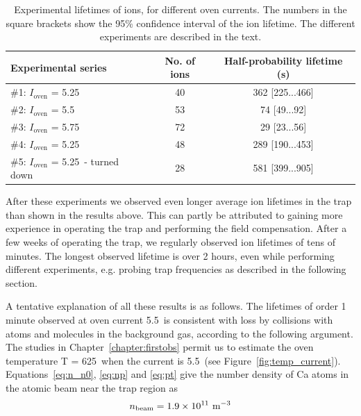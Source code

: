 \begin{table}[t]
\begin{center}
\begin{tabular}{|l|c|c|}
\hline \textbf{Experimental series}  & \textbf{No. of ions} & \textbf{Half-probability lifetime (s)} \\ 
\hline  \#1: $I_{\mbox{oven}}$ =  5.25\A & 40 & 362 [225...466] \\ 
\hline  \#2: $I_{\mbox{oven}}$ = 5.5\A  & 53 & 74 [49...92] \\ 
\hline  \#3: $I_{\mbox{oven}}$ = 5.75\A & 72 & 29 [23...56] \\ 
\hline  \#4: $I_{\mbox{oven}}$ = 5.25\A & 48 & 289 [190...453] \\ 
\hline  \#5: $I_{\mbox{oven}}$ = 5.25\A\, - turned down & 28  &  581 [399...905] \\ 
\hline 
\end{tabular} 
\caption{Experimental lifetimes of ions, for different \CaI{} oven currents. The numbers in the square brackets show the 95\% confidence interval of the ion lifetime. The different experiments are described in the text.}
\label{tab:lifetimes}
\end{center}
\end{table}

After these experiments we observed even longer average ion lifetimes in the trap than shown in the results above. This can partly be attributed to gaining more experience in operating the trap and performing the field compensation. After a few weeks of operating the trap, we regularly observed ion lifetimes of tens of minutes. The longest observed lifetime is over 2 hours, even while performing different experiments, e.g. probing trap frequencies as described in the following section.

A tentative explanation of all these results is as follows. The lifetimes of order 1 minute observed at oven current 5.5\A\, is consistent with loss by collisions with atoms and molecules in the background gas, according to the following argument. The studies in Chapter~\ref{chapter:firstobs} permit us to estimate the oven temperature T = 625\K\, when the current is 5.5\A\, (see Figure~\ref{fig:temp_current}). Equations~\ref{eq:n_n0}, \ref{eq:np} and \ref{eq:pt}  give the number density of Ca atoms in the atomic beam near the trap region as
\[
n_{\rm beam} = 1.9 \times 10^{11} \, \,\mbox{m}^{-3}
\]

